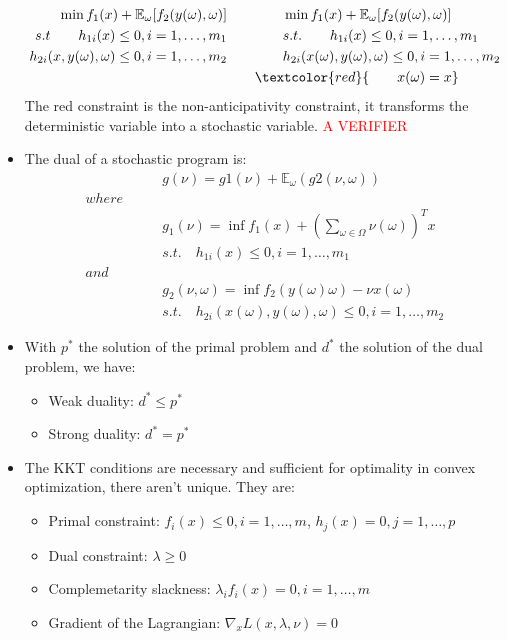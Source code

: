\documentclass[12pt, openany]{report}
\theoremstyle{definition}
\begin{document}
\begin{itemize}
\begin{equation}
\begin{aligned}
			\min f_1(x) + \mathbb{E}_\omega[f_2(y(\omega), \omega)] \qquad & \qquad \min f_1(x) + \mathbb{E}_\omega[f_2(y(\omega), \omega)]\\
			s.t \qquad h_{1i}(x) \leq 0, i = 1, \dots, m_1 \qquad & \qquad s.t. \qquad h_{1i}(x) \leq 0, i = 1, \dots, m_1\\
			h_{2i}(x,y(\omega),\omega) \leq 0, i = 1, \dots, m_2 \qquad & \qquad h_{2i}(x(\omega),y(\omega),\omega) \leq 0, i = 1, \dots, m_2\\
			& \textcolor{red}{\qquad x(\omega) = x} 
		\end{aligned}
	\end{equation}
	The red constraint is the non-anticipativity constraint, it transforms the deterministic variable into a stochastic variable. \textcolor{red}{A VERIFIER}
	\item The dual of a stochastic program is:
	\begin{equation}
		\begin{aligned}
			& g(\nu) = g1(\nu) + \mathbb{E}_\omega(g2(\nu, \omega))\\
			where \qquad &  \\
			& g_1(\nu) = \inf f_1(x) + \left( \displaystyle \sum_{\omega \in \Omega} \nu(\omega) \right)^T x\\
			& s.t. \quad h_{1i} (x) \leq 0, i = 1, \dots, m_1\\
			and \qquad &  \\
			& g_2(\nu, \omega) = \inf f_2(y(\omega) \omega) - \nu x(\omega)\\
			& s.t. \quad h_{2i}(x(\omega), y(\omega), \omega) \leq 0, i = 1, \dots, m_2
		\end{aligned}
	\end{equation}
	\item  With $p^*$ the solution of the primal problem and $d^*$ the solution of the dual problem, we have:
	\begin{itemize}
		\item Weak duality: $d^* \leq p^*$
		\item Strong duality: $d^* = p^*$
	\end{itemize}
	\item The KKT conditions are necessary and sufficient for optimality in convex optimization, there aren't unique. They are:
	\begin{itemize}
		\item Primal constraint: $f_i(x) \leq 0, i = 1, \dots, m$, $h_j(x) = 0, j = 1, \dots, p$
		\item Dual constraint: $\lambda \geq 0$
		\item Complemetarity slackness: $\lambda_i f_i(x) = 0, i = 1, \dots, m$
		\item Gradient of the Lagrangian: $\nabla_x L(x, \lambda, \nu) = 0$
	\end{itemize}
\end{itemize}
\end{document}
